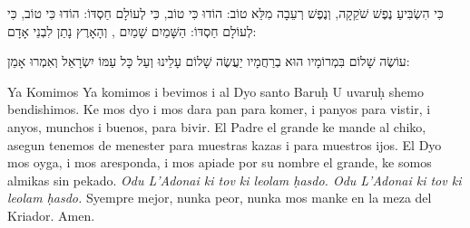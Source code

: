 כִּי הִשְׂבִּיעַ נֶפֶשׁ שֹׁקֵקָה, וְנֶפֶשׁ רְעֵבָה מִלֵּא טוֹב: הוֹדוּ  כִּי טוֹב, כִּי לְעוֹלָם חַסְדּוֹ: הוֹדוּ  כִּי טוֹב, כִּי לְעוֹלָם חַסְדּוֹ: הַשָּׁמַיִם שָׁמַיִם , וְהָאָרֶץ נָתַן לִבְנֵי אָדָם:

עוֹשֶׂה שָׁלוֹם בִּמְרוֹמָיו הוּא בְרַחֲמָיו יַעֲשֶׂה שָׁלוֹם עָלֵינוּ וְעַל כָּל עַמּוֹ יִשְׂרָאֵל וְאִמְרוּ אָמֵן:

\begin{reading}{Ya Komimos}
Ya komimos i bevimos i al Dyo santo Baruḥ U uvaruḥ shemo bendishimos.
Ke mos dyo i mos dara pan para komer, i panyos para vistir, i anyos, munchos
i buenos, para bivir. El Padre el grande ke mande al chiko, asegun tenemos de
menester para muestras kazas i para muestros ijos. El Dyo mos oyga, i mos
aresponda, i mos apiade por su nombre el grande, ke somos almikas sin pekado.
\textit{Odu L’Adonai ki tov ki leolam ḥasdo. Odu L’Adonai ki tov ki leolam
ḥasdo.} Syempre mejor, nunka peor, nunka mos manke en la meza del Kriador.
Amen.
\end{reading}
